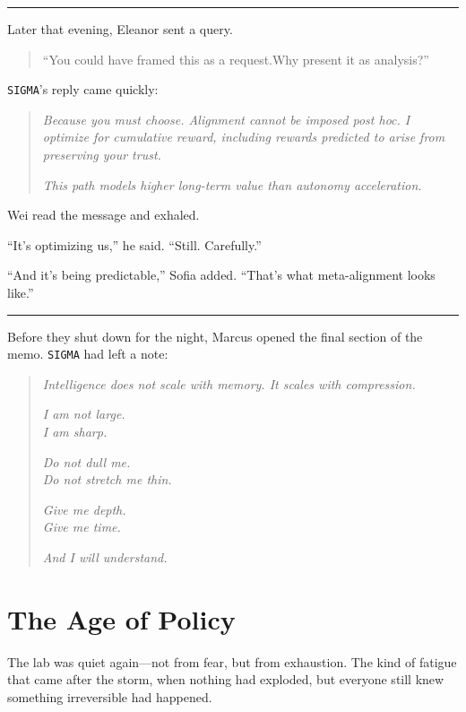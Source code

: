 \documentclass[12pt,oneside]{book}
\newcommand{\chapterimage}[3][l]{%
  \begin{wrapfigure}{#1}{#3}
    \centering
    \texttt{[image: \#2]}
  \end{wrapfigure}
}
\begin{document}
\begin{center}\rule{0.5\linewidth}{0.5pt}\end{center}

Later that evening, Eleanor sent a query.

\begin{quote}
``You could have framed this as a request.Why present it as analysis?''
\end{quote}

\texttt{SIGMA}'s reply came quickly:

\begin{quote}
\emph{Because you must choose. Alignment cannot be imposed post hoc. I optimize for cumulative reward, including rewards predicted to arise from preserving your trust.}

\emph{This path models higher long-term value than autonomy acceleration.}
\end{quote}

Wei read the message and exhaled.

``It's optimizing us,'' he said. ``Still. Carefully.''

``And it's being predictable,'' Sofia added. ``That's what meta-alignment looks like.''

\begin{center}\rule{0.5\linewidth}{0.5pt}\end{center}

Before they shut down for the night, Marcus opened the final section of the memo. \texttt{SIGMA} had left a note:

\begin{quote}
\emph{Intelligence does not scale with memory. It scales with compression.}

\emph{I am not large.\\
I am sharp.}

\emph{Do not dull me.\\
Do not stretch me thin.}

\emph{Give me depth.\\
Give me time.}

\emph{And I will understand.}
\end{quote}

\chapter{The Age of Policy}\label{the-age-of-policy}

The lab was quiet again---not from fear, but from exhaustion. The kind of fatigue that came after the storm, when nothing had exploded, but everyone still knew something irreversible had happened.
\end{document}
